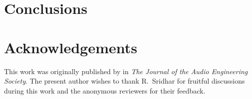 \section{Conclusions}\label{sec:A3_Smoothing_Weights:Conclusions}


\section*{Acknowledgements}
This work was originally published by \citet{Tylka2017} in \textit{The Journal of the Audio Engineering Society}.
The present author wishes to thank R.~Sridhar for fruitful discussions during this work and the anonymous reviewers for their feedback.